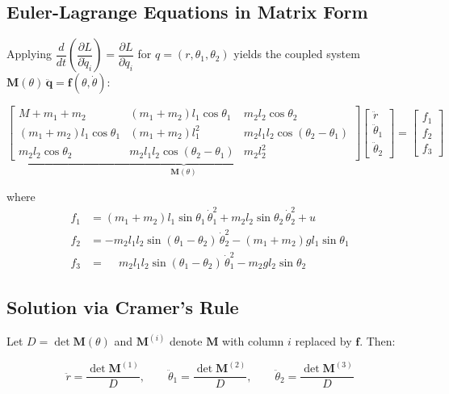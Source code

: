 \documentclass{article}
\begin{document}
\subsection*{Euler-Lagrange Equations in Matrix Form}

Applying $\dfrac{d}{dt}\!\left(\dfrac{\partial L}{\partial \dot{q}_i}\right) = \dfrac{\partial L}{\partial q_i}$
for $q = (r, \theta_1, \theta_2)$ yields the coupled system
$\mathbf{M}(\theta)\,\ddot{\mathbf{q}} = \mathbf{f}(\theta, \dot{\theta})$:

\begin{equation}
\underbrace{\begin{bmatrix}
    M+m_1+m_2 & (m_1+m_2)l_1\cos\theta_1 & m_2 l_2\cos\theta_2 \\
    (m_1+m_2)l_1\cos\theta_1 & (m_1+m_2)l_1^2 & m_2 l_1 l_2\cos(\theta_2-\theta_1) \\
    m_2 l_2\cos\theta_2 & m_2 l_1 l_2\cos(\theta_2-\theta_1) & m_2 l_2^2
\end{bmatrix}}_{\mathbf{M}(\theta)}
\begin{bmatrix} \ddot{r} \\ \ddot{\theta}_1 \\ \ddot{\theta}_2 \end{bmatrix}
=
\begin{bmatrix} f_1 \\ f_2 \\ f_3 \end{bmatrix}
\end{equation}

where
\begin{align}
    f_1 &= (m_1+m_2)l_1\sin\theta_1\,\dot{\theta}_1^2
           + m_2 l_2\sin\theta_2\,\dot{\theta}_2^2 + u \\
    f_2 &= -m_2 l_1 l_2\sin(\theta_1-\theta_2)\,\dot{\theta}_2^2
           - (m_1+m_2)g l_1\sin\theta_1 \\
    f_3 &= \phantom{-}m_2 l_1 l_2\sin(\theta_1-\theta_2)\,\dot{\theta}_1^2
           - m_2 g l_2\sin\theta_2
\end{align}

\subsection*{Solution via Cramer's Rule}

Let $D = \det\mathbf{M}(\theta)$ and $\mathbf{M}^{(i)}$ denote $\mathbf{M}$ with column $i$ replaced by $\mathbf{f}$. Then:

\begin{equation}
    \ddot{r} = \frac{\det\mathbf{M}^{(1)}}{D}, \qquad
    \ddot{\theta}_1 = \frac{\det\mathbf{M}^{(2)}}{D}, \qquad
    \ddot{\theta}_2 = \frac{\det\mathbf{M}^{(3)}}{D}
\end{equation}
\end{document}
